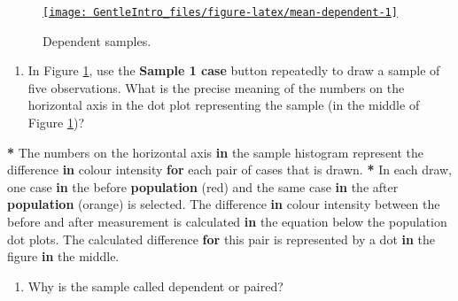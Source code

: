 \documentclass[a4paper]{book}
\newenvironment{Shaded}{\begin{snugshade}}{\end{snugshade}}
\newcommand{\KeywordTok}[1]{\textcolor[rgb]{0,0,0}{\textbf{#1}}}
\newcommand{\StringTok}[1]{\textcolor[rgb]{0.00,0.00,0.00}{#1}}
\newcommand{\ControlFlowTok}[1]{\textcolor[rgb]{0.00,0.00,0.00}{\textbf{#1}}}
\newcommand{\OperatorTok}[1]{\textcolor[rgb]{0.00,0.00,0.00}{\textbf{#1}}}
\newcommand{\NormalTok}[1]{#1}
\providecommand{\tightlist}{%
  \setlength{\itemsep}{0pt}\setlength{\parskip}{0pt}}
\theoremstyle{definition}
\theoremstyle{definition}
\theoremstyle{definition}
\theoremstyle{remark}
\begin{document}
\begin{figure}[H]
\href{http://82.196.4.233:3838/apps/mean-dependent/}{\texttt{[image: GentleIntro\_files/figure-latex/mean-dependent-1]} }\caption{Dependent samples.}\label{fig:mean-dependent}
\end{figure}

\begin{enumerate}
\def\labelenumi{\arabic{enumi}.}
\tightlist
\item
  In Figure \ref{fig:mean-dependent}, use the \textbf{Sample 1 case}
  button repeatedly to draw a sample of five observations. What is the
  precise meaning of the numbers on the horizontal axis in the dot plot
  representing the sample (in the middle of Figure
  \ref{fig:mean-dependent})?
\end{enumerate}

\begin{Shaded}
\begin{Highlighting}[]
\OperatorTok{*}\StringTok{ }\NormalTok{The numbers on the horizontal axis }\ControlFlowTok{in}\NormalTok{ the sample histogram represent the}
\NormalTok{difference }\ControlFlowTok{in}\NormalTok{ colour intensity }\ControlFlowTok{for}\NormalTok{ each pair of cases that is drawn.}
\OperatorTok{*}\StringTok{ }\NormalTok{In each draw, one case }\ControlFlowTok{in}\NormalTok{ the before }\KeywordTok{population}\NormalTok{ (red) and the same case }\ControlFlowTok{in}
\NormalTok{the after }\KeywordTok{population}\NormalTok{ (orange) is selected. The difference }\ControlFlowTok{in}\NormalTok{ colour intensity}
\NormalTok{between the before and after measurement is calculated }\ControlFlowTok{in}\NormalTok{ the equation below}
\NormalTok{the population dot plots. The calculated difference }\ControlFlowTok{for}\NormalTok{ this pair is}
\NormalTok{represented by a dot }\ControlFlowTok{in}\NormalTok{ the figure }\ControlFlowTok{in}\NormalTok{ the middle.}
\end{Highlighting}
\end{Shaded}

\begin{enumerate}
\def\labelenumi{\arabic{enumi}.}
\setcounter{enumi}{1}
\tightlist
\item
  Why is the sample called dependent or paired?
\end{enumerate}
\end{document}
